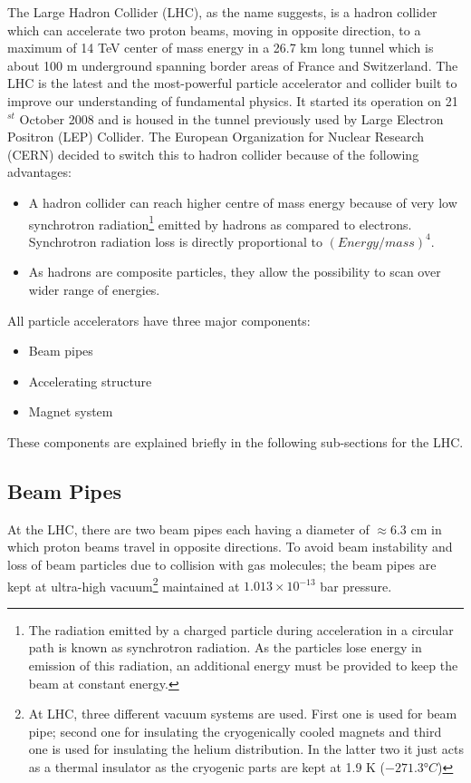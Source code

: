 {{{The Large Hadron Collider (LHC), as the name suggests, is  a hadron collider which can accelerate two proton beams, moving in opposite direction, to a maximum of 14 TeV center of mass energy in a 26.7 km long tunnel which is about 100 m underground spanning border areas of France and Switzerland. The LHC is the latest and the most-powerful particle accelerator and collider built to improve our understanding of fundamental physics. It started its operation on 21$^{st}$ October 2008 and is housed in the tunnel previously used by Large Electron Positron (LEP) Collider. The European Organization for Nuclear Research (CERN) decided to switch this to hadron collider because of the following advantages:
\begin{itemize}
    \item A hadron collider can reach higher centre of mass energy because of very low synchrotron radiation\footnote{The radiation emitted by a charged particle during acceleration in a circular path is known as synchrotron radiation. As the particles lose energy in emission of this radiation, an additional energy must be provided to keep the beam at constant energy.} emitted by hadrons as compared to electrons. Synchrotron radiation loss is directly proportional to $(Energy/mass)^4$.
    \item As hadrons are composite particles, they allow the possibility to scan over wider range of energies.
\end{itemize}
All particle accelerators have three major components:
\begin{itemize}
  \item Beam pipes
  \item Accelerating structure
  \item Magnet system
\end{itemize}
These components are explained briefly in the following sub-sections for the LHC.

\subsection{Beam Pipes} %
\label{sub:beam_pipes}

At the LHC, there are two beam pipes each having a diameter of $\approx$6.3 cm in which proton beams travel in opposite directions. To avoid beam instability and loss of beam particles due to collision with gas molecules; the beam pipes are kept at ultra-high vacuum\footnote{At LHC, three different vacuum systems are used. First one is used for beam pipe; second one for insulating the cryogenically cooled magnets and third one is used for insulating the helium distribution. In the latter two it just acts as a thermal insulator as the cryogenic parts are kept at 1.9 K ($\ang{-271.3}C$)} maintained at $1.013 \times 10^{-13}$ bar pressure.

}}}
